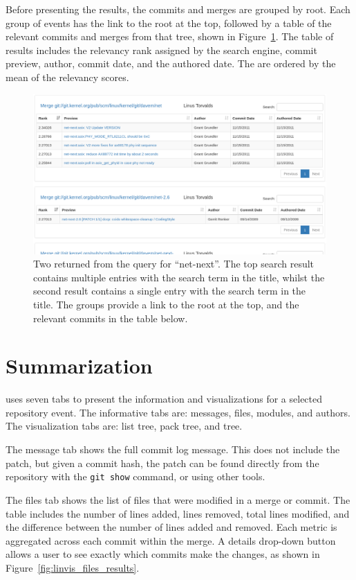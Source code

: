 Before presenting the results, the commits and merges are grouped by
\mt{} root. Each group of events has the link to the root at the
top, followed by a table of the relevant commits and merges from that
tree, shown in Figure~\ref{fig:linvis_search_results}. The table of
results includes the relevancy rank assigned by the search engine,
commit preview, author, commit date, and the authored date. The
 are ordered by the mean of the relevancy scores.

\begin{figure}[htpb]
  \centering
  \includegraphics[width=0.98\linewidth]{Figures/Linvis/search_results.png}
  \caption{Two  returned from the query for ``net-next''. The top
    search result contains multiple entries with the search term in the
    title, whilst the second result contains a single entry with the
    search term in the title. The groups provide a link to the root at
    the top, and the relevant commits in the table below.}
  \label{fig:linvis_search_results}
\end{figure}

\section{Summarization}\label{sec:summarization}

\tool{} uses seven tabs to present the information and visualizations
for a selected repository event.
The informative tabs are: messages, files, modules, and authors.
The visualization tabs are: list tree, pack tree, and \rt{} tree.

The message tab shows the full commit log message. This does not include
the patch, but given a commit hash, the patch can be found directly from
the repository with the \verb|git show| command, or using other tools.

The files tab shows the list of files that were modified in a merge or
commit.
The table includes the number of lines added, lines removed, total lines
modified, and the difference between the number of lines added and
removed.
Each metric is aggregated across each commit within the merge.
A details drop-down button allows a user to see exactly which commits
make the changes, as shown in Figure~\ref{fig:linvis_files_results}.

